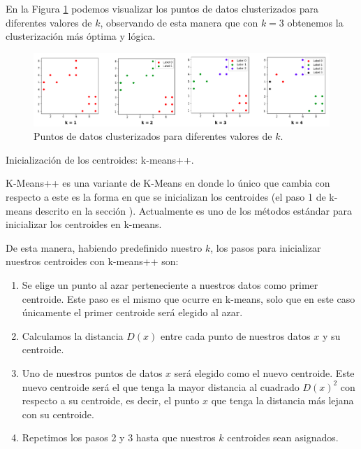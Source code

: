 \documentclass[12pt,a4paper]{article}
\makeatletter
\renewcommand\paragraph{\@startsection{paragraph}{4}{\z@}
            {-2.5ex\@plus -1ex \@minus -.25ex}
            {1.25ex \@plus .25ex}
            {\normalfont\normalsize\bfseries}}
\makeatother
\begin{document}
\begin{sloppypar}
\cleardoublepage
En la Figura \ref{fig:Elbow_3} podemos visualizar los puntos de datos clusterizados para diferentes valores de $k$, observando de esta manera que con $k=3$ obtenemos la clusterización más óptima y lógica.

\begin{figure}[H]    %
 \centering
 \includegraphics[width=1\textwidth]{images/Elbow_3.png}
 \captionsetup{justification=centering,margin=1cm}
 \caption{Puntos de datos clusterizados para diferentes valores de $k$.}
 \label{fig:Elbow_3}
\end{figure} 

\paragraph{Inicialización de los centroides: k-means++.}\label{k_means_plus_plus}

K-Means++\cite{K_means_plus_plus} es una variante de K-Means en donde lo único que cambia con respecto a este es la forma en que se inicializan los centroides (el paso 1 de k-means descrito en la sección \textit{}). Actualmente es uno de los métodos estándar para inicializar los centroides en k-means.

De esta manera, habiendo predefinido nuestro $k$, los pasos para inicializar nuestros centroides con k-means++ son:

\begin{enumerate}
\item Se elige un punto al azar perteneciente a nuestros datos como primer centroide. Este paso es el mismo que ocurre en k-means, solo que en este caso únicamente el primer centroide será elegido al azar.
\item Calculamos la distancia $D(x)$ entre cada punto de nuestros datos $x$ y su centroide. 
\item Uno de nuestros puntos de datos $x$ será elegido como el nuevo centroide. Este nuevo centroide será el que tenga la mayor distancia al cuadrado $D(x)^2$ con respecto a su centroide, es decir, el punto $x$ que tenga la distancia más lejana con su centroide. 
\item Repetimos los pasos 2 y 3 hasta que nuestros $k$ centroides sean asignados.
\end{enumerate}


\end{sloppypar}
\end{document}
